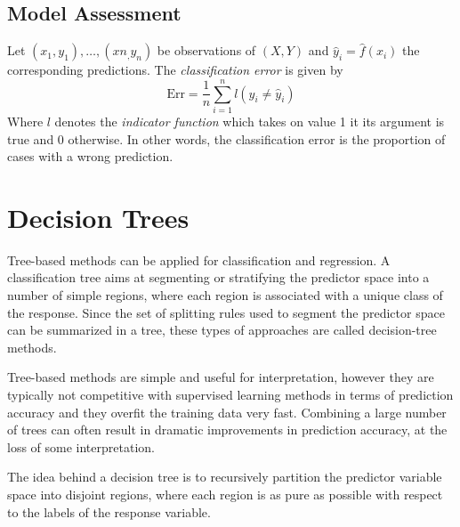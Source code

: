 \documentclass[11pt]{article}
\theoremstyle{definition}
\begin{document}
\subsection{Model Assessment}
\begin{definition}
	Let $(x_1, y_1),\dots,(x n_,y_n)$ be observations of $(X,Y)$ and $\hat{y}_i = \hat{f}(x_i)$ the corresponding predictions. The \emph{classification error} is given by
	\begin{equation*}
		\text{Err} = \frac{1}{n}\sum_{i=1}^{n} l(y_i \neq \hat{y}_i)
	\end{equation*}
	Where $l$ denotes the \emph{indicator function} which takes on value 1 it its argument is true and 0 otherwise. In other words, the classification error is the proportion of cases with a wrong prediction.
\end{definition}

\section{Decision Trees}
Tree-based methods can be applied for classification and regression. A classification tree aims at segmenting or stratifying the predictor space into a number of simple regions, where each region is associated with a unique class of the response. Since the set of splitting rules used to segment the predictor space can be summarized in a tree, these types of approaches are called decision-tree methods.

Tree-based methods are simple and useful for interpretation, however they are typically not competitive with supervised learning methods in terms of prediction accuracy and they overfit the training data very fast. Combining a large number of trees can often result in dramatic improvements in prediction accuracy, at the loss of some interpretation.

The idea behind a decision tree is to recursively partition the predictor variable space into disjoint regions, where each region is as pure as possible with respect to the labels of the response variable.
\end{document}
